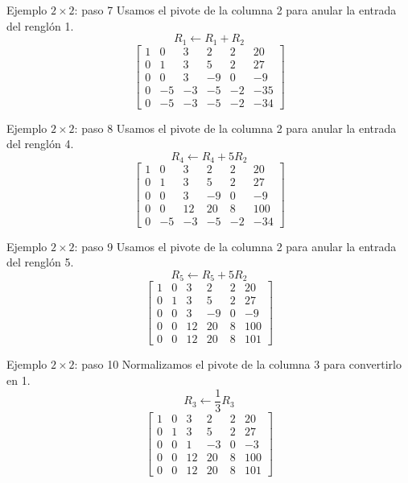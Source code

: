 \documentclass[aspectratio=169,9pt]{beamer}
\theoremstyle{remark}
\begin{document}
\begin{frame}[t]{Ejemplo $2\times2$: paso 7}
Usamos el pivote de la columna 2 para anular la entrada del renglón 1.
\[
R_{1}\leftarrow R_{1}+R_{2}
\]
\[
\left[\begin{array}{ccccc|c}
1 & 0 & 3 & 2 & 2 & 20\\
0 & 1 & 3 & 5 & 2 & 27\\
0 & 0 & 3 & -9 & 0 & -9\\
0 & -5 & -3 & -5 & -2 & -35\\
0 & -5 & -3 & -5 & -2 & -34
\end{array}\right]
\]
\end{frame}
\begin{frame}[t]{Ejemplo $2\times2$: paso 8}
Usamos el pivote de la columna 2 para anular la entrada del renglón 4.
\[
R_{4}\leftarrow R_{4}+5R_{2}
\]
\[
\left[\begin{array}{ccccc|c}
1 & 0 & 3 & 2 & 2 & 20\\
0 & 1 & 3 & 5 & 2 & 27\\
0 & 0 & 3 & -9 & 0 & -9\\
0 & 0 & 12 & 20 & 8 & 100\\
0 & -5 & -3 & -5 & -2 & -34
\end{array}\right]
\]
\end{frame}
\begin{frame}[t]{Ejemplo $2\times2$: paso 9}
Usamos el pivote de la columna 2 para anular la entrada del renglón 5.
\[
R_{5}\leftarrow R_{5}+5R_{2}
\]
\[
\left[\begin{array}{ccccc|c}
1 & 0 & 3 & 2 & 2 & 20\\
0 & 1 & 3 & 5 & 2 & 27\\
0 & 0 & 3 & -9 & 0 & -9\\
0 & 0 & 12 & 20 & 8 & 100\\
0 & 0 & 12 & 20 & 8 & 101
\end{array}\right]
\]
\end{frame}
\begin{frame}[t]{Ejemplo $2\times2$: paso 10}
Normalizamos el pivote de la columna 3 para convertirlo en 1.
\[
R_{3}\leftarrow \frac{1}{3}R_{3}
\]
\[
\left[\begin{array}{ccccc|c}
1 & 0 & 3 & 2 & 2 & 20\\
0 & 1 & 3 & 5 & 2 & 27\\
0 & 0 & 1 & -3 & 0 & -3\\
0 & 0 & 12 & 20 & 8 & 100\\
0 & 0 & 12 & 20 & 8 & 101
\end{array}\right]
\]
\end{frame}
\end{document}
